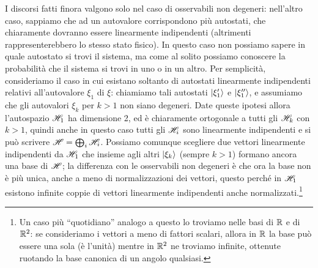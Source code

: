 I discorsi fatti finora valgono solo nel caso di osservabili non degeneri: nell'altro caso, sappiamo che ad un autovalore corrispondono più autostati, che chiaramente dovranno essere linearmente indipendenti (altrimenti rappresenterebbero lo stesso stato fisico).
In questo caso non possiamo sapere in quale autostato si trovi il sistema, ma come al solito possiamo conoscere la probabilità che il sistema si trovi in uno o in un altro.
Per semplicità, consideriamo il caso in cui esistano soltanto di autostati linearmente indipendenti relativi all'autovalore $\xi_1$ di $\xi$: chiamiamo tali autostati $\left|{\xi_1'}\right\rangle$ e $\left|{\xi_1''}\right\rangle$, e assumiamo che gli autovalori $\xi_k$ per $k>1$ non siano degeneri.
Date queste ipotesi allora l'autospazio $\mathscr H_1$ ha dimensione 2, ed è chiaramente ortogonale a tutti gli $\mathscr H_k$ con $k>1$, quindi anche in questo caso tutti gli $\mathscr H_i$ sono linearmente indipendenti e si può scrivere $\mathscr H=\bigoplus_i\mathscr H_i$.
Possiamo comunque scegliere due vettori linearmente indipendenti da $\mathscr H_1$ che insieme agli altri $\left|{\xi_k}\right\rangle$ (sempre $k>1$) formano ancora una base di $\mathscr H$; la differenza con le osservabili non degeneri è che ora la base non è più unica, anche a meno di normalizzazioni dei vettori, questo perch\'e in $\mathscr H_1$ esistono infinite coppie di vettori linearmente indipendenti anche normalizzati.\footnote{Un caso più ``quotidiano'' analogo a questo lo troviamo nelle basi di $\mathbb{R}$ e di $\mathbb{R}^2$: se consideriamo i vettori a meno di fattori scalari, allora in $\mathbb{R}$ la base può essere una sola (è l'unità) mentre in $\mathbb{R}^2$ ne troviamo infinite, ottenute ruotando la base canonica di un angolo qualsiasi.}

